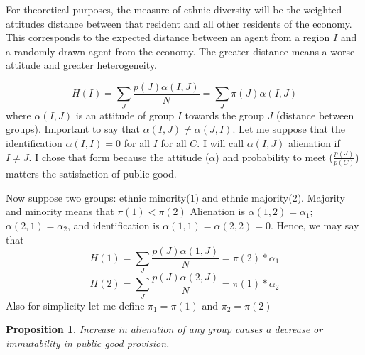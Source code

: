 \documentclass[12pt]{article}
\newtheorem{proposition}{Proposition}
\begin{document}
For theoretical purposes, the measure of ethnic diversity will be the weighted attitudes distance between that resident and all other residents of the economy. This corresponds to the expected distance between an agent from a region $I$ and a randomly drawn agent from the economy. The greater distance means a worse attitude and greater heterogeneity.

\[ H(I) = \sum_{J} \frac{p(J) \alpha(I, J)}{N} = \sum_{J} \pi(J) \alpha(I,J) \]
where $\alpha(I, J)$ is an attitude of group $I$ towards the group $J$ (distance between groups). Important to say that $\alpha(I, J) \ne \alpha(J, I)$. Let me suppose that the identification $\alpha(I,I) = 0$ for all $I$ for all $C$. I will call $\alpha(I, J)$ alienation if $I \ne J$. I chose that form because the attitude ($\alpha$) and probability to meet ($\frac{p(J)}{p(C)}$) matters the satisfaction of public good.

Now suppose two groups: ethnic minority(1) and ethnic majority(2). Majority and minority means that $\pi(1) < \pi(2)$ Alienation is $\alpha(1,2) = \alpha_1$; $\alpha(2,1) = \alpha_2$, and identification is $\alpha(1,1) = \alpha(2,2) = 0$. Hence, we may say that
\[ H(1) = \sum_{J} \frac{p(J) \alpha(1, J)}{N} = \pi(2) * \alpha_1 \]
\[ H(2) = \sum_{J} \frac{p(J) \alpha(2, J)}{N} = \pi(1) * \alpha_2 \]
Also for simplicity let me define $\pi_1 = \pi(1)$ and $\pi_2 = \pi(2)$

\begin{proposition}
    Increase in alienation of any group causes a decrease or immutability in public good provision.
\end{proposition}
\end{document}

